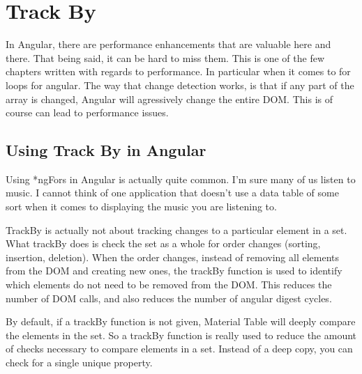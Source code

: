 \section{ Track By }
\maketitle{}

In Angular, there are performance enhancements that are valuable here and there.
That being said, it can be hard to miss them. This is one of the few chapters
written with regards to performance. In particular when it comes to for loops
for angular. The way that change detection works, is that if any part of the
array is changed, Angular will agressively change the entire DOM. This is of
course can lead to performance issues.

\subsection{ Using Track By in Angular }
Using *ngFors in Angular is actually quite common. I'm sure many of us listen
to music. I cannot think of one application that doesn't use a data table of
some sort when it comes to displaying the music you are listening to.

TrackBy is actually not about tracking changes to a particular element in a set.
What trackBy does is check the set as a whole for order changes (sorting,
insertion, deletion). When the order changes, instead of removing all elements
from the DOM and creating new ones, the trackBy function is used to identify
which elements do not need to be removed from the DOM. This reduces the number
of DOM calls, and also reduces the number of angular digest cycles.

By default, if a trackBy function is not given, Material Table will deeply
compare the elements in the set. So a trackBy function is really used to reduce
the amount of checks necessary to compare elements in a set. Instead of a deep
copy, you can check for a single unique property.
